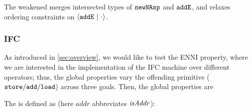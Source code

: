 \vspace{-.4cm}\par\nobreak\noindent
The weakened \tyName{} merges intersected types of \(\boldsymbol{{\tt newNRsp}}\) and \(\boldsymbol{{\tt addE}}\), and relaxes ordering constraints on \({\langle} {\boldsymbol{{\tt addE}}~|~{\cdot}} {\rangle}\).

\newpage
\subsubsection*{IFC} As introduced in \autoref{sec:overview}, we would like to test the ENNI property, where we are interested in the implementation of the IFC machine over different operators; thus, the global properties vary the offending primitive (\(\boldsymbol{{\tt store}}/\boldsymbol{{\tt add}}/\boldsymbol{{\tt load}}\)) across three goals.
Then, the global properties are
\vspace{-.35cm}\par{}
\vspace{-.4cm}\par\nobreak\noindent
The \tyName{} is defined as (here \(\mathit{addr}\) abbreviates \(\mathit{isAddr}\)):
